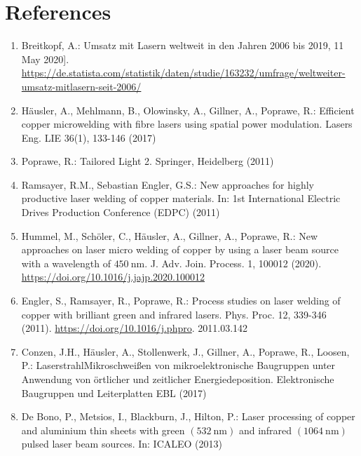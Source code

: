 \documentclass[10pt]{article}
\begin{document}
\section*{References}
\begin{enumerate}
  \item Breitkopf, A.: Umsatz mit Lasern weltweit in den Jahren 2006 bis 2019, 11 May 2020]. \href{https://de.statista.com/statistik/daten/studie/163232/umfrage/weltweiter-umsatz-mitlasern-seit-2006/}{https://de.statista.com/statistik/daten/studie/163232/umfrage/weltweiter-umsatz-mitlasern-seit-2006/}

  \item Häusler, A., Mehlmann, B., Olowinsky, A., Gillner, A., Poprawe, R.: Efficient copper microwelding with fibre lasers using spatial power modulation. Lasers Eng. LIE 36(1), 133-146 (2017)

  \item Poprawe, R.: Tailored Light 2. Springer, Heidelberg (2011)

  \item Ramsayer, R.M., Sebastian Engler, G.S.: New approaches for highly productive laser welding of copper materials. In: 1st International Electric Drives Production Conference (EDPC) (2011)

  \item Hummel, M., Schöler, C., Häusler, A., Gillner, A., Poprawe, R.: New approaches on laser micro welding of copper by using a laser beam source with a wavelength of $450 \mathrm{~nm}$. J. Adv. Join. Process. 1, 100012 (2020). \href{https://doi.org/10.1016/j.jajp.2020.100012}{https://doi.org/10.1016/j.jajp.2020.100012}

  \item Engler, S., Ramsayer, R., Poprawe, R.: Process studies on laser welding of copper with brilliant green and infrared lasers. Phys. Proc. 12, 339-346 (2011). \href{https://doi.org/10.1016/j.phpro}{https://doi.org/10.1016/j.phpro}. 2011.03.142

  \item Conzen, J.H., Häusler, A., Stollenwerk, J., Gillner, A., Poprawe, R., Loosen, P.: LaserstrahlMikroschweißen von mikroelektronische Baugruppen unter Anwendung von örtlicher und zeitlicher Energiedeposition. Elektronische Baugruppen und Leiterplatten EBL (2017)

  \item De Bono, P., Metsios, I., Blackburn, J., Hilton, P.: Laser processing of copper and aluminium thin sheets with green $(532 \mathrm{~nm})$ and infrared $(1064 \mathrm{~nm})$ pulsed laser beam sources. In: ICALEO (2013)


\end{enumerate}
\end{document}
